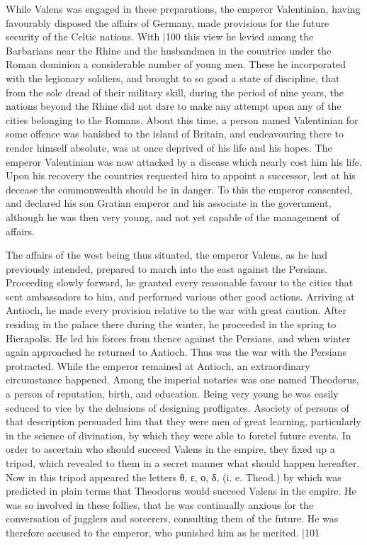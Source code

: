 While Valens was engaged in these preparations, the emperor Valentinian, having favourably disposed the affairs of Germany, made provisions for the future security of the Celtic nations. With
|100 this view he levied among the Barbarians near the Rhine and the husbandmen in the countries under the Roman dominion a considerable number of young men. These he incorporated with the legionary soldiers, and brought to so good a state of discipline, that from the sole dread of their military skill, during the period of nine years, the nations beyond the Rhine did not dare to make any attempt upon any of the cities belonging to the Romans. About this time, a person named Valentinian for some offence
was banished to the island of Britain, and endeavouring there to render himself absolute, was at once deprived of his life and his hopes. The emperor Valentinian was now attacked by a disease
which nearly cost him his life. Upon his recovery the countries requested him to appoint a successor, lest at his decease the commonwealth should be in danger. To this the emperor consented, and declared his son Gratian emperor and his associate in the government, although he was then very young, and not yet capable of the management of affairs.

The affairs of the west being thus situated, the emperor Valens, as he had previously intended, prepared to march into the east against the Persians. Proceeding
slowly forward, he granted every reasonable favour to the cities that sent ambassadors to him, and performed various other good actions. Arriving at Antioch, he made every provision relative to the war with great caution. After residing in the palace there during the winter, he proceeded in the spring to Hierapolis. He led his forces from thence against the Persians, and when winter again approached he returned to Antioch. Thus was the war with the Persians protracted. While the emperor remained at Antioch, an extraordinary circumstance happened. Among the imperial notaries was one named Theodorus, a person of reputation, birth, and education. Being very young he was easily seduced to vice by the delusions of designing profligates. A\emph{}society of persons of that description persuaded him that they were men of great learning, particularly in the science of divination, by which they were able to foretel future events. In order to ascertain who should succeed Valens in the empire, they fixed up a tripod, which revealed to them in a secret manner what should happen hereafter. Now in this tripod appeared the letters
θ, ε, ο, δ, (i. e. Theod.) by which was predicted in plain terms that Theodorus would succeed Valens in the empire. He was so involved in these follies, that he was continually anxious for the conversation of jugglers and sorcerers, consulting them of the future. He was therefore accused to the emperor, who punished him as he merited.
|101


